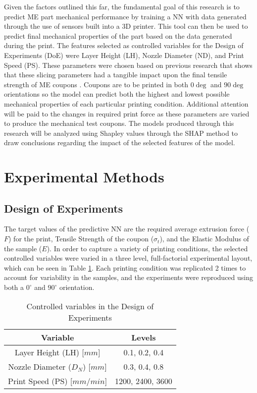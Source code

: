 \documentclass[main.tex]{subfiles}
\begin{document}
Given the factors outlined this far, the fundamental goal of this research is to predict ME part mechanical performance by training a NN with data generated through the use of sensors built into a 3D printer. This tool can then be used to predict final mechanical properties of the part based on the data generated during the print. The features selected as controlled variables for the Design of Experiments (DoE) were Layer Height (LH), Nozzle Diameter (ND), and Print Speed (PS). These parameters were chosen based on previous research that shows that these slicing parameters had a tangible impact upon the final tensile strength of ME coupons \cite{Koch2017, Rankouhi2016}. Coupons are to be printed in both $0\deg$ and $90\deg$ orientations so the model can predict both the highest and lowest possible mechanical properties of each particular printing condition. Additional attention will be paid to the changes in required print force as these parameters are varied to produce the mechanical test coupons. The models produced through this research will be analyzed using Shapley values through the SHAP method to draw conclusions regarding the impact of the selected features of the model.

\section{Experimental Methods} \label{sec:ml_meth}

\subsection{Design of Experiments}\label{ssec:doe}

The target values of the predictive NN are the required average extrusion force ($F$) for the print, Tensile Strength of the coupon ($\sigma_{t}$), and the Elastic Modulus of the sample ($E$). In order to capture a variety of printing conditions, the selected controlled variables were varied in a three level, full-factorial experimental layout, which can be seen in Table \ref{tab:ml_doe}. Each printing condition was replicated 2 times to account for variability in the samples, and the experiments were reproduced using both a $0^{\circ}$ and $90^{\circ}$ orientation.

\begin{table}[!htbp] %
	\renewcommand{\arraystretch}{1.5}
	\centering
	\caption{Controlled variables in the Design of Experiments}
	\begin{tabular}{ c c } 
		\toprule
		\textbf{Variable} & \textbf{Levels} \\
		\midrule
		 Layer Height (LH) [$mm$]  &  0.1, 0.2, 0.4\\
		 Nozzle Diameter ($D_{N}$) [$mm$] & 0.3, 0.4, 0.8\\
		 Print Speed (PS) [$mm/min$] & 1200, 2400, 3600\\
		\bottomrule
	\end{tabular}
	\label{tab:ml_doe}
\end{table}
\end{document}
